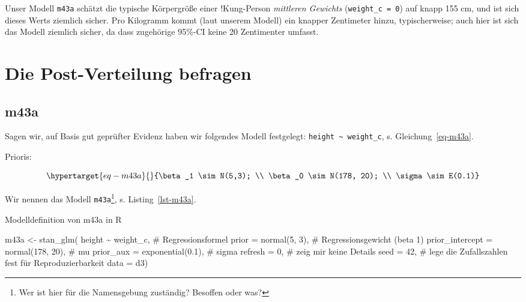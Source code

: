 \documentclass[
  a4paper,
  DIV=11]{scrreprt}
\newenvironment{Shaded}{\begin{snugshade}}{\end{snugshade}}
\newcommand{\AttributeTok}[1]{\textcolor[rgb]{0.40,0.45,0.13}{#1}}
\newcommand{\CommentTok}[1]{\textcolor[rgb]{0.37,0.37,0.37}{#1}}
\newcommand{\DecValTok}[1]{\textcolor[rgb]{0.68,0.00,0.00}{#1}}
\newcommand{\FloatTok}[1]{\textcolor[rgb]{0.68,0.00,0.00}{#1}}
\newcommand{\FunctionTok}[1]{\textcolor[rgb]{0.28,0.35,0.67}{#1}}
\newcommand{\NormalTok}[1]{\textcolor[rgb]{0.00,0.23,0.31}{#1}}
\newcommand{\OtherTok}[1]{\textcolor[rgb]{0.00,0.23,0.31}{#1}}
\newcommand{\SpecialCharTok}[1]{\textcolor[rgb]{0.37,0.37,0.37}{#1}}
\theoremstyle{definition}
\theoremstyle{remark}
\begin{document}
Unser Modell \texttt{m43a} schätzt die typische Körpergröße einer
!Kung-Person \emph{mittleren Gewichts} (\texttt{weight\_c\ =\ 0}) auf
knapp 155 cm, und ist sich dieses Werts ziemlich sicher. Pro Kilogramm
kommt (laut unserem Modell) ein knapper Zentimeter hinzu,
typischerweise; auch hier ist sich das Modell ziemlich sicher, da dass
zugehörige 95\%-CI keine 20 Zentimenter umfasst.

\hypertarget{die-post-verteilung-befragen-1}{%
\section{Die Post-Verteilung
befragen}\label{die-post-verteilung-befragen-1}}

\hypertarget{m43a}{%
\subsection{m43a}\label{m43a}}

Sagen wir, auf Basis gut geprüfter Evidenz haben wir folgendes Modell
festgelegt: \texttt{height\ \textasciitilde{}\ weight\_c}, s.
Gleichung~\ref{eq-m43a}.

Prioris:

\begin{equation}\protect\hypertarget{eq-m43a}{}{\beta_1 \sim N(5,3); \\
\beta_0 \sim N(178, 20); \\
\sigma \sim E(0.1)}\label{eq-m43a}\end{equation}

Wir nennen das Modell \texttt{m43a}\footnote{Wer ist hier für die
  Namensgebung zuständig? Besoffen oder was?}, s.
Listing~\ref{lst-m43a}.

\begin{codelisting}

\caption{Modelldefinition von m43a in R}

\hypertarget{lst-m43a}{%
\label{lst-m43a}}%
\begin{Shaded}
\begin{Highlighting}[]
\NormalTok{m43a }\OtherTok{\textless{}{-}}
  \FunctionTok{stan\_glm}\NormalTok{(}
\NormalTok{    height }\SpecialCharTok{\textasciitilde{}}\NormalTok{ weight\_c,  }\CommentTok{\# Regressionsformel}
    \AttributeTok{prior =} \FunctionTok{normal}\NormalTok{(}\DecValTok{5}\NormalTok{, }\DecValTok{3}\NormalTok{),  }\CommentTok{\# Regressionsgewicht (beta 1)}
    \AttributeTok{prior\_intercept =} \FunctionTok{normal}\NormalTok{(}\DecValTok{178}\NormalTok{, }\DecValTok{20}\NormalTok{),  }\CommentTok{\# mu}
    \AttributeTok{prior\_aux =} \FunctionTok{exponential}\NormalTok{(}\FloatTok{0.1}\NormalTok{),  }\CommentTok{\# sigma}
    \AttributeTok{refresh =} \DecValTok{0}\NormalTok{,  }\CommentTok{\# zeig mir keine Details}
    \AttributeTok{seed =} \DecValTok{42}\NormalTok{,  }\CommentTok{\# lege die Zufallszahlen fest für Reproduzierbarkeit}
    \AttributeTok{data =}\NormalTok{ d3)}
\end{Highlighting}
\end{Shaded}

\end{codelisting}
\end{document}

